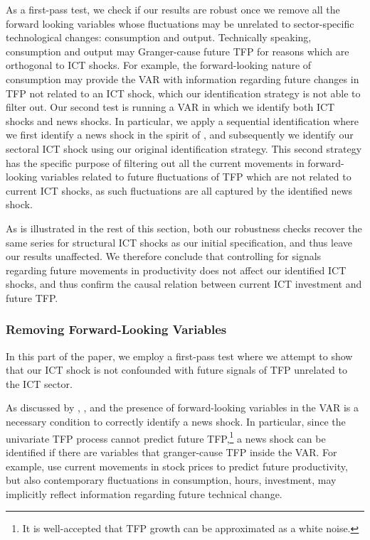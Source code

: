 \documentclass[12pt]{article}
\begin{document}
As a first-pass test, %
we check if our results are robust once we remove all the forward looking variables whose fluctuations may be unrelated to sector-specific technological changes: consumption and output. Technically speaking, consumption and output may Granger-cause future TFP for reasons which are orthogonal to ICT shocks. For example, the forward-looking nature of consumption may provide the VAR with information regarding future changes in TFP not related to an ICT shock, which our identification strategy is not able to filter out. Our second test is running a VAR in which we identify both ICT shocks and news shocks. In particular, we apply a sequential identification where we first identify a news shock in the spirit of \cite{barsky2011news}, and subsequently we identify our sectoral ICT shock using our original identification strategy. This second strategy has the specific purpose of filtering out all the current movements in forward-looking variables related to future fluctuations of TFP which are not related to current ICT shocks, as such fluctuations are all captured by the identified news shock.

As is illustrated in the rest of this section, both our robustness checks recover the same series for structural ICT shocks as our initial specification, and thus leave our results unaffected. We therefore conclude that controlling for signals regarding future movements in productivity does not affect our identified ICT shocks, and thus confirm the causal relation between current ICT investment and future TFP.

\subsubsection{Removing Forward-Looking Variables}

In this part of the paper, we employ a first-pass test where we attempt to show that our ICT shock is not confounded with future signals of TFP unrelated to the ICT sector. 

As discussed by \cite{sims2012news}, \cite{forni2014sufficient}, and \cite{barsky2015whither} the presence of forward-looking variables in the VAR is a necessary condition to correctly identify a news shock. In particular, since the univariate TFP process cannot predict future TFP,\footnote{It is well-accepted that TFP growth can be approximated as a white noise.} a news shock can be identified if there are variables that granger-cause TFP inside the VAR. For example, \cite{beaudry2006stock} use current movements in stock prices to predict future productivity, but also contemporary fluctuations in consumption, hours, investment, may implicitly reflect information regarding future technical change.
\end{document}
